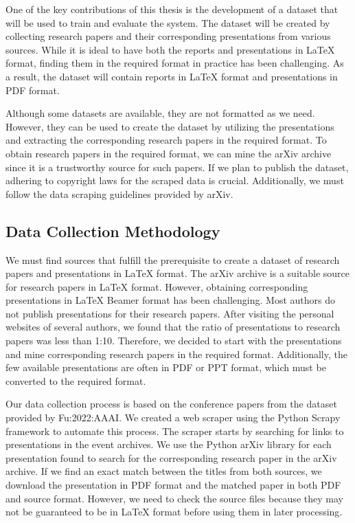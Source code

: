 One of the key contributions of this thesis is the development of a dataset that will be used to train and evaluate the system. The dataset will be created by collecting research papers and their corresponding presentations from various sources. While it is ideal to have both the reports and presentations in LaTeX format, finding them in the required format in practice has been challenging. As a result, the dataset will contain reports in LaTeX format and presentations in PDF format.

Although some datasets are available, they are not formatted as we need. However, they can be used to create the dataset by utilizing the presentations and extracting the corresponding research papers in the required format. To obtain research papers in the required format, we can mine the arXiv archive since it is a trustworthy source for such papers. If we plan to publish the dataset, adhering to copyright laws for the scraped data is crucial. Additionally, we must follow the data scraping guidelines provided by arXiv.

\subsection{Data Collection Methodology}
We must find sources that fulfill the prerequisite to create a dataset of research papers and presentations in LaTeX format. The arXiv archive is a suitable source for research papers in LaTeX format. However, obtaining corresponding presentations in LaTeX Beamer format has been challenging. Most authors do not publish presentations for their research papers. After visiting the personal websites of several authors, we found that the ratio of presentations to research papers was less than 1:10. Therefore, we decided to start with the presentations and mine corresponding research papers in the required format. Additionally, the few available presentations are often in PDF or PPT format, which must be converted to the required format. 

Our data collection process is based on the conference papers from the dataset provided by Fu:2022:AAAI. We created a web scraper using the Python Scrapy framework to automate this process. The scraper starts by searching for links to presentations in the event archives. We use the Python arXiv library for each presentation found to search for the corresponding research paper in the arXiv archive. If we find an exact match between the titles from both sources, we download the presentation in PDF format and the matched paper in both PDF and source format. However, we need to check the source files because they may not be guaranteed to be in LaTeX format before using them in later processing.

